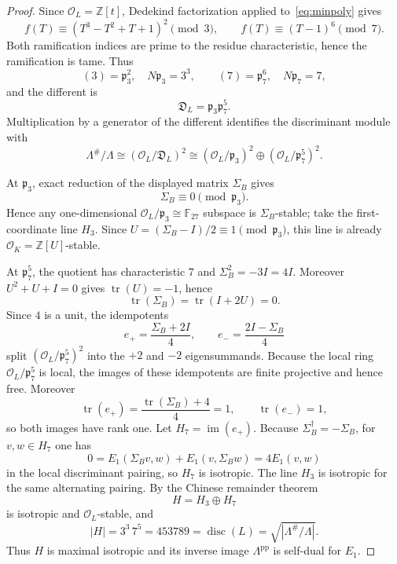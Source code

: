 \begin{proof}
Since $\mathcal O_L=\mathbb Z[t]$, Dedekind factorization applied to~\eqref{eq:minpoly} gives
\[
 f(T)\equiv (T^3-T^2+T+1)^2\pmod 3,
 \qquad
 f(T)\equiv (T-1)^6\pmod 7.
\]
Both ramification indices are prime to the residue characteristic, hence the ramification is tame.  Thus
\[
 (3)=\mathfrak p_3^2,\quad N\mathfrak p_3=3^3,
 \qquad
 (7)=\mathfrak p_7^6,\quad N\mathfrak p_7=7,
\]
and the different is
\[
 \mathfrak D_L=\mathfrak p_3\mathfrak p_7^5.
\]
Multiplication by a generator of the different identifies the discriminant module with
\[
 \Lambda^\#/\Lambda\cong
 (\mathcal O_L/\mathfrak D_L)^2
 \cong
 (\mathcal O_L/\mathfrak p_3)^2\oplus
 (\mathcal O_L/\mathfrak p_7^5)^2.
\]

At $\mathfrak p_3$, exact reduction of the displayed matrix $\Sigma_B$ gives
\[
 \Sigma_B\equiv0\pmod{\mathfrak p_3}.
\]
Hence any one-dimensional $\mathcal O_L/\mathfrak p_3\cong\mathbb F_{27}$ subspace is $\Sigma_B$-stable; take the first-coordinate line $H_3$.  Since $U=(\Sigma_B-I)/2\equiv1\pmod{\mathfrak p_3}$, this line is already $\mathcal O_K=\mathbb Z[U]$-stable.

At $\mathfrak p_7^5$, the quotient has characteristic $7$ and $\Sigma_B^2=-3I=4I$.  Moreover $U^2+U+I=0$ gives $\operatorname{tr}(U)=-1$, hence
\[
 \operatorname{tr}(\Sigma_B)=\operatorname{tr}(I+2U)=0.
\]
Since $4$ is a unit, the idempotents
\[
 e_+=\frac{\Sigma_B+2I}{4},\qquad e_-=\frac{2I-\Sigma_B}{4}
\]
split $(\mathcal O_L/\mathfrak p_7^5)^2$ into the $+2$ and $-2$ eigensummands.  Because the local ring $\mathcal O_L/\mathfrak p_7^5$ is local, the images of these idempotents are finite projective and hence free.  Moreover
\[
 \operatorname{tr}(e_+)=\frac{\operatorname{tr}(\Sigma_B)+4}{4}=1,
 \qquad
 \operatorname{tr}(e_-)=1,
\]
so both images have rank one.  Let $H_7=\operatorname{im}(e_+)$.  Because $\Sigma_B^\dagger=-\Sigma_B$, for $v,w\in H_7$ one has
\[
 0=E_1(\Sigma_Bv,w)+E_1(v,\Sigma_Bw)=4E_1(v,w)
\]
in the local discriminant pairing, so $H_7$ is isotropic.  The line $H_3$ is isotropic for the same alternating pairing.  By the Chinese remainder theorem
\[
 H=H_3\oplus H_7
\]
is isotropic and $\mathcal O_L$-stable, and
\[
 |H|=3^3\,7^5=453789=\operatorname{disc}(L)
       =\sqrt{|\Lambda^\#/\Lambda|}.
\]
Thus $H$ is maximal isotropic and its inverse image $\Lambda^{\mathrm{pp}}$ is self-dual for $E_1$.


\end{proof}
